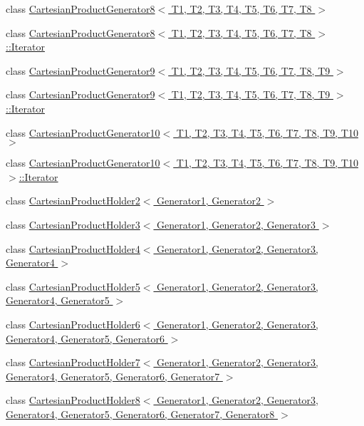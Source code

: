 \begin{DoxyCompactItemize}
\item 
class \hyperlink{classtesting_1_1internal_1_1CartesianProductGenerator8}{\-Cartesian\-Product\-Generator8$<$ T1, T2, T3, T4, T5, T6, T7, T8 $>$}
\item 
class \hyperlink{classtesting_1_1internal_1_1CartesianProductGenerator8_1_1Iterator}{\-Cartesian\-Product\-Generator8$<$ T1, T2, T3, T4, T5, T6, T7, T8 $>$\-::\-Iterator}
\item 
class \hyperlink{classtesting_1_1internal_1_1CartesianProductGenerator9}{\-Cartesian\-Product\-Generator9$<$ T1, T2, T3, T4, T5, T6, T7, T8, T9 $>$}
\item 
class \hyperlink{classtesting_1_1internal_1_1CartesianProductGenerator9_1_1Iterator}{\-Cartesian\-Product\-Generator9$<$ T1, T2, T3, T4, T5, T6, T7, T8, T9 $>$\-::\-Iterator}
\item 
class \hyperlink{classtesting_1_1internal_1_1CartesianProductGenerator10}{\-Cartesian\-Product\-Generator10$<$ T1, T2, T3, T4, T5, T6, T7, T8, T9, T10 $>$}
\item 
class \hyperlink{classtesting_1_1internal_1_1CartesianProductGenerator10_1_1Iterator}{\-Cartesian\-Product\-Generator10$<$ T1, T2, T3, T4, T5, T6, T7, T8, T9, T10 $>$\-::\-Iterator}
\item 
class \hyperlink{classtesting_1_1internal_1_1CartesianProductHolder2}{\-Cartesian\-Product\-Holder2$<$ Generator1, Generator2 $>$}
\item 
class \hyperlink{classtesting_1_1internal_1_1CartesianProductHolder3}{\-Cartesian\-Product\-Holder3$<$ Generator1, Generator2, Generator3 $>$}
\item 
class \hyperlink{classtesting_1_1internal_1_1CartesianProductHolder4}{\-Cartesian\-Product\-Holder4$<$ Generator1, Generator2, Generator3, Generator4 $>$}
\item 
class \hyperlink{classtesting_1_1internal_1_1CartesianProductHolder5}{\-Cartesian\-Product\-Holder5$<$ Generator1, Generator2, Generator3, Generator4, Generator5 $>$}
\item 
class \hyperlink{classtesting_1_1internal_1_1CartesianProductHolder6}{\-Cartesian\-Product\-Holder6$<$ Generator1, Generator2, Generator3, Generator4, Generator5, Generator6 $>$}
\item 
class \hyperlink{classtesting_1_1internal_1_1CartesianProductHolder7}{\-Cartesian\-Product\-Holder7$<$ Generator1, Generator2, Generator3, Generator4, Generator5, Generator6, Generator7 $>$}
\item 
class \hyperlink{classtesting_1_1internal_1_1CartesianProductHolder8}{\-Cartesian\-Product\-Holder8$<$ Generator1, Generator2, Generator3, Generator4, Generator5, Generator6, Generator7, Generator8 $>$}

\end{DoxyCompactItemize}
